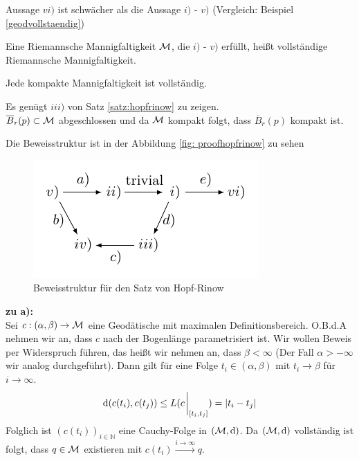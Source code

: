 \begin{bem}
Aussage $vi)$ ist schwächer als die Aussage $i)$ - $v)$ (Vergleich: Beispiel \ref{geodvollstaendig}) 
\end{bem}


\begin{defs}
    Eine Riemannsche Mannigfaltigkeit $\mathcal{M}$, die  $i)$ - $v)$ erfüllt, heißt vollständige Riemannsche Mannigfaltigkeit.
\end{defs}

\begin{kor}
    \label{kor:kompaktvoll}
    Jede kompakte Mannigfaltigkeit ist vollständig.
\end{kor}
\begin{bew}
Es genügt $iii)$ von Satz \ref{satz:hopfrinow} zu zeigen.\\
$\overline{B}_r(p) \subset \mathcal{M}$ abgeschlossen und da $\mathcal{M}$ kompakt folgt, dass $\overline{B}_r (p)$ kompakt ist.    
\end{bew}

\begin{bew}
    Die Beweisstruktur ist in der Abbildung \ref{fig: proofhopfrinow} zu sehen
    \begin{figure}[H]
        \centering
        \includegraphics[width=0.5\linewidth]{figures/tikz/proofhopfrinow.pdf}
        \caption{Beweisstruktur für den Satz von Hopf-Rinow}
        \label{fig:proofhopfrinow}
    \end{figure} 


\textbf{zu a):}\\
Sei $c : (\alpha , \beta) \to \mathcal{M}$ eine Geodätische mit maximalen Definitionsbereich.
O.B.d.A nehmen wir an, dass $c$ nach der Bogenlänge parametrisiert ist. 
Wir wollen Beweis per Widerspruch führen, das heißt wir nehmen an, dass $\beta < \infty$ (Der Fall $\alpha > - \infty$ wir analog durchgeführt).
Dann gilt für eine Folge $t_i \in (\alpha , \beta)$ mit $t_i \to \beta$ für $i \to \infty$.
\begin{align*}
    \dd (c (t_i), c(t_j)) \leq L (c \eval_{[t_i , t_j ]}) = \abs{t_i - t_j}
\end{align*}
Folglich ist $(c(t_i))_{i \in \mathbb{N}}$ eine Cauchy-Folge in $(\mathcal{M} , \dd)$. 
Da $(\mathcal{M}, \dd)$ vollständig ist folgt, dass $q \in \mathcal{M}$ existieren mit $c(t_i) \overset{i \to \infty}{\longrightarrow}q$.

\end{bew}

